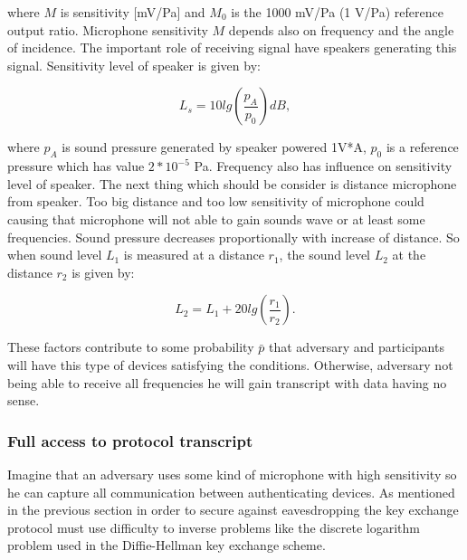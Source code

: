\documentclass[11pt,titlepage]{article}
\theoremstyle{plain}
\begin{document}
where $M$ is sensitivity [mV/Pa] and $M_0$ is the 1000 mV/Pa (1 V/Pa) reference output ratio. Microphone sensitivity $M$ depends also on frequency and the angle of incidence. The important role of receiving signal have speakers generating this signal. Sensitivity level of speaker is given by: 

\begin{equation}
	L_s = 10 lg(\frac{p_A}{p_0})dB,
\end{equation}

where $p_A$ is sound pressure generated by speaker powered 1V*A, $p_0$ is a reference pressure which has value $2*10^{-5}$ Pa. Frequency also has influence on sensitivity level of speaker. The next thing which should be consider is distance microphone from speaker. Too big distance and too low sensitivity of microphone could causing that microphone will not able to gain sounds wave or at least some frequencies. Sound pressure decreases proportionally with increase of distance. So when sound level $L_{1}$ is measured at a distance $r_1$, the sound level $L_2$ at the distance $r_2$ is given by:

\begin{equation}
	L_2 = L_1 + 20 lg (\frac{r_1}{r_2}).
\end{equation}

These factors contribute to some probability $\bar{p}$ that adversary and participants will have this type of devices satisfying the conditions. Otherwise, adversary not being able to receive all frequencies he will gain transcript with data having no sense.


\subsubsection{Full access to protocol transcript}
Imagine that an adversary uses some kind of microphone with high sensitivity so he can capture all communication between authenticating devices. As mentioned in the previous section in order to secure against eavesdropping the key exchange protocol must use difficulty to inverse problems like the discrete logarithm problem used in the Diffie-Hellman key exchange scheme.
\end{document}
